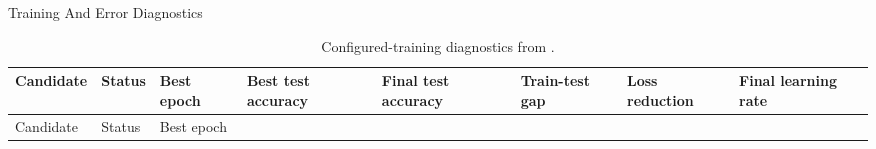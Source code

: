 \documentclass[
  ignorenonframetext,
]{beamer}
\begin{document}
\begin{frame}{Training And Error Diagnostics}
\begin{longtable}[]{@{}
  >{\raggedright\arraybackslash}p{}
  >{\raggedright\arraybackslash}p{}
  >{\raggedright\arraybackslash}p{}
  >{\raggedright\arraybackslash}p{}
  >{\raggedright\arraybackslash}p{}
  >{\raggedright\arraybackslash}p{}
  >{\raggedright\arraybackslash}p{}
  >{\raggedright\arraybackslash}p{}@{}}
\caption{Configured-training diagnostics from
\protect{}.}\label{tbl:training-diagnostics}\tabularnewline
\toprule\noalign{}
\begin{minipage}[b]{\linewidth}\raggedright
Candidate
\end{minipage} & \begin{minipage}[b]{\linewidth}\raggedright
Status
\end{minipage} & \begin{minipage}[b]{\linewidth}\raggedright
Best epoch
\end{minipage} & \begin{minipage}[b]{\linewidth}\raggedright
Best test accuracy
\end{minipage} & \begin{minipage}[b]{\linewidth}\raggedright
Final test accuracy
\end{minipage} & \begin{minipage}[b]{\linewidth}\raggedright
Train-test gap
\end{minipage} & \begin{minipage}[b]{\linewidth}\raggedright
Loss reduction
\end{minipage} & \begin{minipage}[b]{\linewidth}\raggedright
Final learning rate
\end{minipage} \\
\midrule\noalign{}
\endfirsthead
\toprule\noalign{}
\begin{minipage}[b]{\linewidth}\raggedright
Candidate
\end{minipage} & \begin{minipage}[b]{\linewidth}\raggedright
Status
\end{minipage} & \begin{minipage}[b]{\linewidth}\raggedright
Best epoch

\end{minipage}
\end{longtable}
\end{frame}
\end{document}
